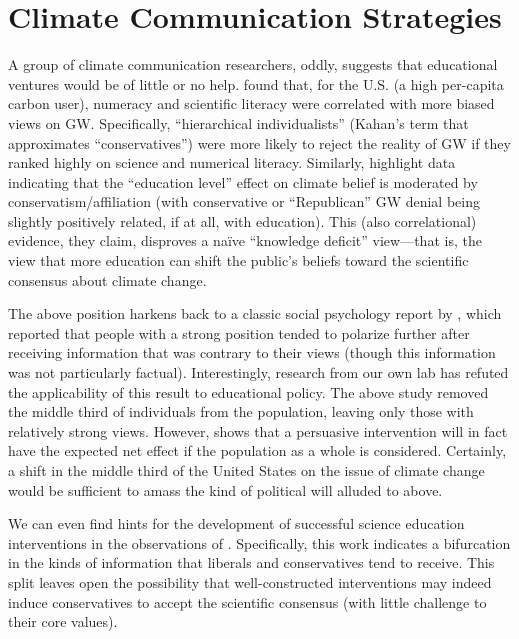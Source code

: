 
\section{Climate Communication Strategies}
\label{sec:comm-strategies}

A group of climate communication researchers, oddly, suggests that educational
ventures would be of little or no help. \textcite{kahan_polarizing_2012} found
that, for the U.S. (a high per-capita carbon user), numeracy and scientific
literacy were correlated with more biased views on GW. Specifically,
“hierarchical individualists” (Kahan's term that approximates “conservatives”)
were more likely to reject the reality of GW if they ranked highly on science
and numerical literacy. Similarly, \textcite{mccright_politicization_2011}
highlight data indicating that the ``education level'' effect on climate belief
is moderated by conservatism/affiliation (with conservative or ``Republican'' GW
denial being slightly positively related, if at all, with education). This (also
correlational) evidence, they claim, disproves a naïve ``knowledge deficit''
view---that is, the view that more education can shift the public's beliefs
toward the scientific consensus about climate change. 

The above position harkens back to a classic social psychology report by
\textcite{lord_biased_1979}, which reported that people with a strong position
tended to polarize further after receiving information that was contrary to
their views (though this information was  not particularly factual).
Interestingly, research from our own lab has refuted the applicability of this
result to educational policy. The above study removed the middle third of
individuals from the population, leaving only those with relatively strong
views. However, \textcite{nelson_criminal_2007} shows that a persuasive
intervention will in fact have the expected net effect if the population as a
whole is considered. Certainly, a shift in the middle third of the United States
on the issue of climate change would be sufficient to amass the kind of
political will alluded to above.

We can even find hints for the development of successful science education
interventions in the observations of \textcite{mccright_politicization_2011}.
Specifically, this work indicates a bifurcation in the kinds of information that
liberals and conservatives tend to receive.  This split leaves open the
possibility that well-constructed interventions may indeed induce conservatives
to accept the scientific consensus (with little challenge to their core values).  

